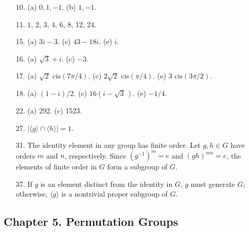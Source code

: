{\begin{itemize}
\item[10.]
(a) $0, 1, -1$.
(b) $1, -1$.
 
\item[11.]
1, 2, 3, 4, 6, 8, 12, 24.
 
\item[15.]
(a) $3i -3$.
(c) $43 -18i$.
(e) $i$.
 
\item[16.]
(a) $\sqrt{3} + i$.
(c) $-3$.
 
\item[17.]
(a) $\sqrt{2} \mbox{ cis}( 7 \pi /4)$.
(c) $2 \sqrt{2} \mbox{ cis}( \pi /4)$.
(e) $3 \mbox{ cis}(3 \pi/2)$.
 
\item[18.]
(a) $(1-i)/2$.
(c) $16(i -\sqrt{3}\, )$.
(e) $-1/4$.
 
\item[22.]
(a) 292.
(c) 1523.
 
 
\item[27.]
$|\langle g \rangle \cap \langle h \rangle| = 1$.
 
 
\item[31.]
The identity element in any group has finite order. Let $g, h \in G$
have orders $m$ and $n$, respectively. Since $(g^{-1})^m = e$ and
$(gh)^{mn} = e$, the elements of finite order in $G$ form a subgroup
of $G$.
 
\item[37.]
If $g$ is an element distinct from the identity in $G$, $g$ must
generate $G$; otherwise, $\langle g \rangle$ is a nontrivial proper
subgroup of $G$.
 
\end{itemize}
}
 
\subsection*{Chapter 5. Permutation Groups}
 
